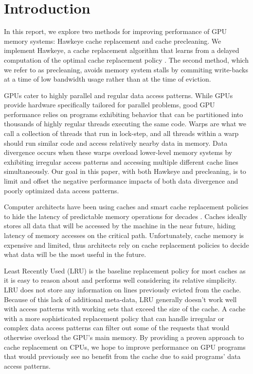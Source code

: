 \chapter{Introduction}

In this report, we explore two methods for improving performance of GPU memory systems: Hawkeye cache replacement and cache precleaning. We implement Hawkeye, a cache replacement algorithm that learns from a delayed computation of the optimal cache replacement policy \cite{hawkeye}. The second method, which we refer to as precleaning, avoids memory system stalls by commiting write-backs at a time of low bandwidth usage rather than at the time of eviction.

GPUs cater to highly parallel and regular data access patterns. While GPUs provide hardware specifically tailored for parallel problems, good GPU performance relies on programs exhibiting behavior that can be partitioned into thousands of highly regular threads executing the same code. Warps are what we call a collection of threads that run in lock-step, and all threads within a warp should run similar code and access relatively nearby data in memory. Data divergence occurs when these warps overload lower-level memory systems by exhibiting irregular access patterns and accessing multiple different cache lines simultaneously. Our goal in this paper, with both Hawkeye and precleaning, is to limit and offset the negative performance impacts of both data divergence and poorly optimized data access patterns.

Computer architects have been using caches and smart cache replacement policies to hide the latency of predictable memory operations for decades \cite{deadblock,lruperf,cache_burst,dip,eva,rrip}. Caches ideally stores all data that will be accessed by the machine in the near future, hiding latency of memory accesses on the critical path. Unfortunately, cache memory is expensive and limited, thus architects rely on cache replacement policies to decide what data will be the most useful in the future.

Least Recently Used (LRU) is the baseline replacement policy for most caches as it is easy to reason about and performs well considering its relative simplicity. LRU does not store any information on lines previously evicted from the cache. Because of this lack of additional meta-data, LRU generally doesn't work well with access patterns with working sets that exceed the size of the cache. A cache with a more sophisticated replacement policy that can handle irregular or complex data access patterns can filter out some of the requests that would otherwise overload the GPU's main memory. By providing a proven approach to cache replacement on CPUs, we hope to improve performance on GPU programs that would previously see no benefit from the cache due to said programs’ data access patterns.

